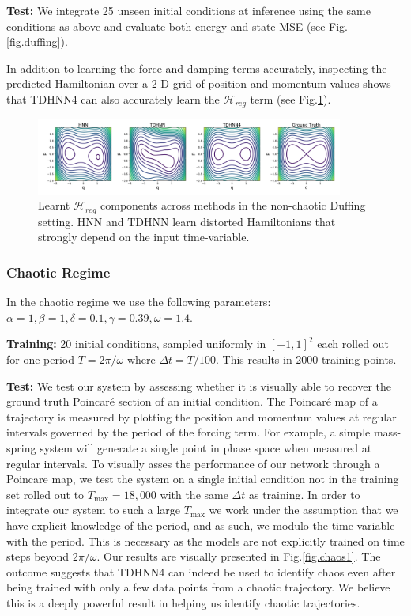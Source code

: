 \documentclass{article}
\begin{document}
\textbf{Test:} We integrate 25 unseen initial conditions at inference using the same conditions as above and evaluate both energy and state MSE (see Fig.\ref{fig.duffing}).

In addition to learning the force and damping terms accurately, inspecting the predicted Hamiltonian over a 2-D grid of position and momentum values shows that TDHNN4 can also accurately learn the $\mathcal{H}_{reg}$ term (see Fig.\ref{duffing_ham}).

\begin{figure}[h]
\centering
\includegraphics[width=0.9\textwidth]{figures/duffing_ham_1.pdf}
\caption{Learnt $\mathcal{H}_{reg}$ components across methods in the non-chaotic Duffing setting. HNN and TDHNN learn distorted Hamiltonians that strongly depend on the input time-variable.}
\label{duffing_ham}
\end{figure}

\subsubsection{Chaotic Regime}

In the chaotic regime we use the following parameters:
$\alpha =1,\beta=1,\delta=0.1,\gamma=0.39,\omega=1.4$. 

\textbf{Training:} 20 initial conditions, sampled uniformly in $[-1,1]^2$ each rolled out for one period $T=2\pi/\omega$ where $\Delta t = T/100$. This results in 2000 training points.

\textbf{Test:} We test our system by assessing whether it is visually able to recover the ground truth Poincar\'e section of an initial condition. The Poincar\'e map of a trajectory is measured by plotting the position and momentum values at regular intervals governed by the period of the forcing term. For example, a simple mass-spring system will generate a single point in phase space when measured at regular intervals. To visually asses the performance of our network through a Poincare map, we test the system on a single initial condition not in the training set rolled out to $T_{\max} = 18,000$ with the same $\Delta t$ as training. In order to integrate our system to such a large $T_{\max}$ we work under the assumption that we have explicit knowledge of the period, and as such, we modulo the time variable with the period. This is necessary as the models are not explicitly trained on time steps beyond $2\pi/\omega$. Our results are visually presented in Fig.\ref{fig.chaos1}. The outcome suggests that TDHNN4 can indeed be used to identify chaos even after being trained with only a few data points from a chaotic trajectory. We believe this is a deeply powerful result in helping us identify chaotic trajectories.
\end{document}
